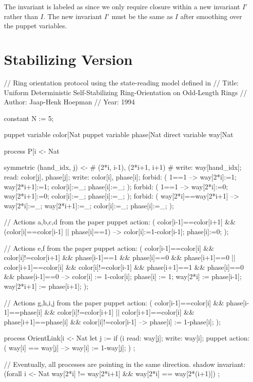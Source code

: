 The invariant is labeled as  since we only require closure within a new invariant $I'$ rather than $I$.
The new invariant $I'$ must be the same as $I$ after smoothing over the puppet variables.

\section{Stabilizing Version}
\begin{code}
// Ring orientation protocol using the state-reading model defined in
// Title: Uniform Deterministic Self-Stabilizing Ring-Orientation on Odd-Length Rings
// Author: Jaap-Henk Hoepman
// Year: 1994

constant N := 5;

puppet variable color[Nat %
puppet variable phase[Nat %
direct variable way[Nat %

process P[i <- Nat %
{
  symmetric (hand_idx, j)  <- {# (2*i, i-1), (2*i+1, i+1) #}
  {
    write: way[hand_idx];
    read: color[j], phase[j];
  }
  write: color[i], phase[i];
  forbid: ( 1==1 --> way[2*i]:=1; way[2*i+1]:=1; color[i]:=_; phase[i]:=_; );
  forbid: ( 1==1 --> way[2*i]:=0; way[2*i+1]:=0; color[i]:=_; phase[i]:=_; );
  forbid: ( way[2*i]==way[2*i+1] --> way[2*i]:=_; way[2*i+1]:=_; color[i]:=_; phase[i]:=_; );

  // Actions a,b,c,d from the paper
  puppet action:
    ( color[i-1]==color[i+1] && (color[i]==color[i-1] || phase[i]==1)
     -->
      color[i]:=1-color[i-1];
      phase[i]:=0;
    );

  // Actions e,f from the paper
  puppet action:
    (    color[i-1]==color[i] && color[i]!=color[i+1] && phase[i-1]==1 && phase[i]==0 && phase[i+1]==0
      || color[i+1]==color[i] && color[i]!=color[i-1] && phase[i+1]==1 && phase[i]==0 && phase[i-1]==0
     -->
      color[i] := 1-color[i];
      phase[i] := 1;
      way[2*i] := phase[i-1];
      way[2*i+1] := phase[i+1];
    );

  // Actions g,h,i,j from the paper
  puppet action:
    (    color[i-1]==color[i] && phase[i-1]==phase[i] && color[i]!=color[i+1]
      || color[i+1]==color[i] && phase[i+1]==phase[i] && color[i]!=color[i-1]
     -->
      phase[i] := 1-phase[i];
    );
}

process OrientLink[i <- Nat %
{
  let j := if (i %
  read: way[j];
  write: way[i];
  puppet action:
    ( way[i] == way[j] --> way[i] := 1-way[j]; )
    ;
}

// Eventually, all processes are pointing in the same direction.
shadow invariant:
  (forall i <- Nat %
   way[2*i] != way[2*i+1]
   &&
   way[2*i] == way[2*(i+1)])
  ;
\end{code}



